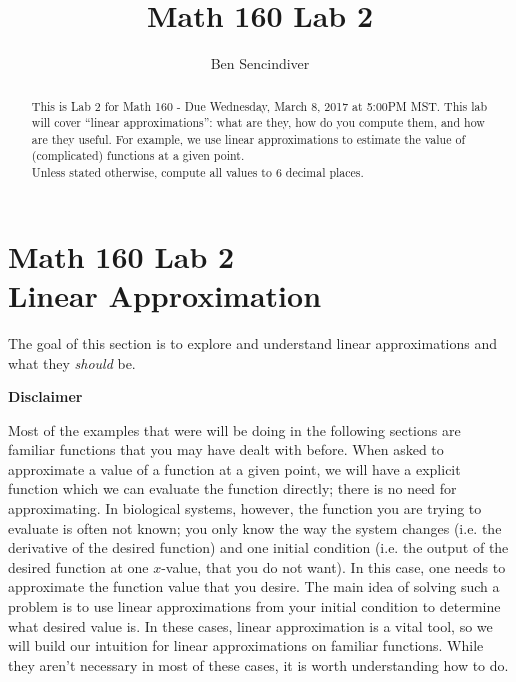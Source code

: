 \documentclass[handout,nooutcomes]{ximera}
\title{Math 160 Lab 2}
\author{Ben Sencindiver} %
\begin{document}
\section{Math 160 Lab 2 \\ Linear Approximation}

\begin{abstract}
This is Lab 2 for Math 160 - Due Wednesday, March 8, 2017 at 5:00PM MST.
This lab will cover ``linear approximations'': what are they,
how do you compute them, and how are they useful. For example,
we use linear approximations to estimate the value of (complicated)
functions at a given point.\\

Unless stated otherwise, compute all values to $6$ decimal places.
\end{abstract}



\maketitle



The goal of this section is to explore and understand linear
approximations and what they {\it should} be. 

{\bf Disclaimer}

Most of the examples that were will be doing in the following sections
are familiar functions that you may have dealt with before. 
When asked to approximate a value of a function at a given point, 
we will have a explicit function which we can evaluate the 
function directly; there is no need for approximating. 
In biological systems, however, the function you are trying to evaluate
is often not known; you only know the way the system changes 
(i.e. the derivative of the desired function) and one initial condition
(i.e. the output of the desired function at one $x$-value, that you
do not want). In this case, one needs to approximate the function value
that you desire. The main idea of solving such a problem is to use
linear approximations from your initial condition to determine what desired
value is. In these cases, linear approximation is a vital tool,
so we will build our intuition for linear approximations
on familiar functions. While they aren't necessary in most of these
cases, it is worth understanding how to do.\\
\end{document}
